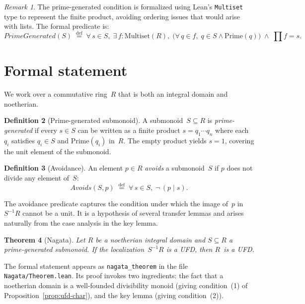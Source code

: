 \documentclass[11pt]{article}
\theoremstyle{plain}
\newtheorem{theorem}{Theorem}[section]
\theoremstyle{definition}
\newtheorem{definition}[theorem]{Definition}
\theoremstyle{remark}
\newtheorem{remark}[theorem]{Remark}
\newcommand{\li}[1]{\texorpdfstring{\texttt{#1}}{#1}}
\newcommand{\lf}[1]{\texorpdfstring{\nolinkurl{#1}}{#1}}
\begin{document}
\begin{remark}\label{rem:formal-pg}
The prime-generated condition is formalized using Lean's \li{Multiset} type to
represent the finite product, avoiding ordering issues that would arise with
lists.  The formal predicate is:
\[
  \mathit{PrimeGenerated}(S) \;\stackrel{\mathrm{def}}{=}\;
  \forall\, s\in S,\;\exists\, f:\mathrm{Multiset}(R),\;
  \bigl(\forall\, q\in f,\;q\in S \wedge \mathrm{Prime}(q)\bigr)
  \;\wedge\; \textstyle\prod f = s.
\]
\end{remark}


\section{Formal statement}\label{sec:statement}

We work over a commutative ring~$R$ that is both an integral domain and
noetherian.

\begin{definition}[Prime-generated submonoid]\label{def:primegen}
A submonoid~$S\subseteq R$ is \emph{prime-generated} if every $s\in S$ can be
written as a finite product $s=q_1\cdots q_n$ where each~$q_i$ satisfies
$q_i\in S$ and $\mathrm{Prime}(q_i)$ in~$R$.  The empty product yields
$s=1$, covering the unit element of the submonoid.
\end{definition}

\begin{definition}[Avoidance]\label{def:avoids}
An element $p\in R$ \emph{avoids} a submonoid~$S$ if $p$ does not divide any
element of~$S$:
\[
  \mathit{Avoids}(S,p) \;\stackrel{\mathrm{def}}{=}\;
  \forall\, s\in S,\;\neg\,(p\mid s).
\]
\end{definition}

\noindent
The avoidance predicate captures the condition under which the image of~$p$ in
$S^{-1}R$ cannot be a unit.  It is a hypothesis of several transfer lemmas and
arises naturally from the case analysis in the key lemma.

\begin{theorem}[Nagata]\label{thm:nagata}
Let $R$ be a noetherian integral domain and $S\subseteq R$ a prime-generated
submonoid.  If the localization~$S^{-1}R$ is a UFD, then $R$~is a UFD.
\end{theorem}

\noindent
The formal statement appears as \li{nagata\_theorem} in the file
\lf{Nagata/Theorem.lean}.  Its proof invokes two ingredients: the fact that a
noetherian domain is a well-founded divisibility monoid (giving
condition~(1) of Proposition~\ref{prop:ufd-char}), and the key lemma
(giving condition~(2)).
\end{document}
